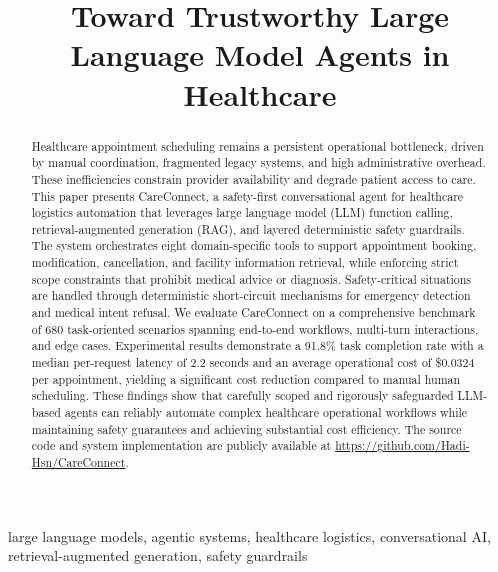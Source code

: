 \documentclass[conference]{IEEEtran}
\begin{document}
\title{Toward Trustworthy Large Language Model Agents in Healthcare}

\author{
}

\maketitle

\begin{abstract}
Healthcare appointment scheduling remains a persistent operational bottleneck, driven by manual coordination, fragmented legacy systems, and high administrative overhead. These inefficiencies constrain provider availability and degrade patient access to care. This paper presents CareConnect, a safety-first conversational agent for healthcare logistics automation that leverages large language model (LLM) function calling, retrieval-augmented generation (RAG), and layered deterministic safety guardrails. The system orchestrates eight domain-specific tools to support appointment booking, modification, cancellation, and facility information retrieval, while enforcing strict scope constraints that prohibit medical advice or diagnosis. Safety-critical situations are handled through deterministic short-circuit mechanisms for emergency detection and medical intent refusal. We evaluate CareConnect on a comprehensive benchmark of 680 task-oriented scenarios spanning end-to-end workflows, multi-turn interactions, and edge cases. Experimental results demonstrate a 91.8\% task completion rate with a median per-request latency of 2.2 seconds and an average operational cost of \$0.0324 per appointment, yielding a significant cost reduction compared to manual human scheduling. These findings show that carefully scoped and rigorously safeguarded LLM-based agents can reliably automate complex healthcare operational workflows while maintaining safety guarantees and achieving substantial cost efficiency. The source code and system implementation are publicly available at \url{https://github.com/Hadi-Hsn/CareConnect}.
\end{abstract}

\begin{IEEEkeywords}
large language models, agentic systems, healthcare logistics, conversational AI, retrieval-augmented generation, safety guardrails
\end{IEEEkeywords}
\end{document}
